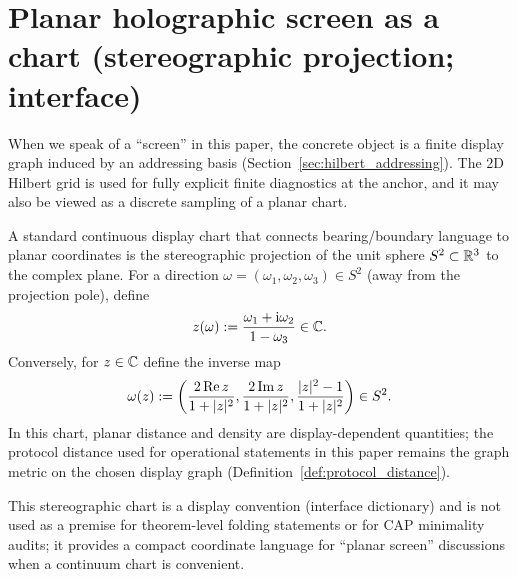 \section*{Planar holographic screen as a chart (stereographic projection; interface)}
\label{subsec:planar_screen_chart}
\InterfaceTag When we speak of a ``screen'' in this paper, the concrete object is a finite display graph induced by an addressing basis (Section~\ref{sec:hilbert_addressing}).
The $2$D Hilbert grid is used for fully explicit finite diagnostics at the anchor, and it may also be viewed as a discrete sampling of a planar chart.

\InterfaceTag A standard continuous display chart that connects bearing/boundary language to planar coordinates is the stereographic projection of the unit sphere $S^2\subset\mathbb{R}^3$ to the complex plane.
For a direction $\omega=(\omega_1,\omega_2,\omega_3)\in S^2$ (away from the projection pole), define
\[
z(\omega) := \frac{\omega_1+\mathrm{i}\omega_2}{1-\omega_3}\in\mathbb{C}.
\]
Conversely, for $z\in\mathbb{C}$ define the inverse map
\[
\omega(z) := \left(\frac{2\operatorname{Re} z}{1+|z|^2},\frac{2\operatorname{Im} z}{1+|z|^2},\frac{|z|^2-1}{1+|z|^2}\right)\in S^2.
\]
In this chart, planar distance and density are display-dependent quantities; the protocol distance used for operational statements in this paper remains the graph metric on the chosen display graph (Definition~\ref{def:protocol_distance}).

\AuditTag This stereographic chart is a display convention (interface dictionary) and is not used as a premise for theorem-level folding statements or for CAP minimality audits; it provides a compact coordinate language for ``planar screen'' discussions when a continuum chart is convenient.


